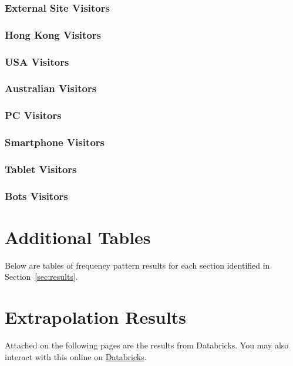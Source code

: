 \documentclass[12pt,titlepage]{article}
\begin{document}
\subsubsection{External Site Visitors}

\subsubsection{Hong Kong Visitors}

\subsubsection{USA Visitors}

\subsubsection{Australian Visitors}

\subsubsection{PC Visitors}

\subsubsection{Smartphone Visitors}

\subsubsection{Tablet Visitors}

\subsubsection{Bots Visitors}

\newpage
\appendix

\section{Additional Tables}

Below are tables of frequency pattern results for each section identified in Section~\ref{sec:results}.


\clearpage


\section{Extrapolation Results}
\label{apx:results}

Attached on the following pages are the results from Databricks. You may also interact with this online on \href{https://databricks-prod-cloudfront.cloud.databricks.com/public/4027ec902e239c93eaaa8714f173bcfc/7364378259770565/3552971541306612/8155742302574378/latest.html}{Databricks}.
\end{document}
